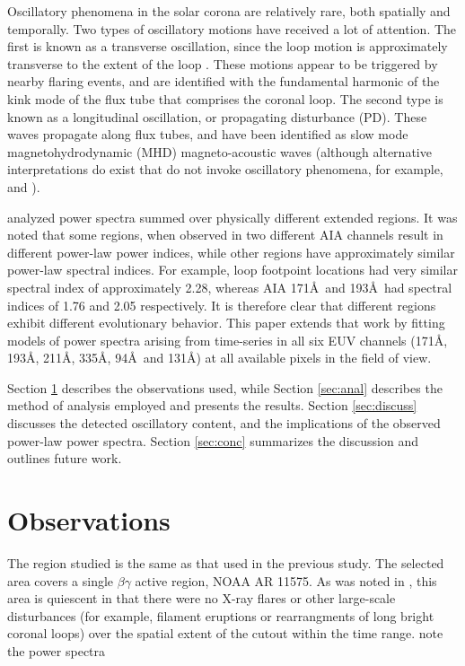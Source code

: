 \documentclass[onecolumn]{emulateapj}
\newcommand{\allaiaeuv}{171\AA, 193\AA, 211\AA, 335\AA, 94\AA\ and 131\AA}
\begin{document}
Oscillatory phenomena in the solar corona are relatively rare, both
spatially and temporally.  Two types of oscillatory motions have
received a lot of attention.  The first is known as a transverse
oscillation, since the loop motion is approximately transverse to the
extent of the loop \citep{1999Sci...285..862N}.  These motions appear
to be triggered by nearby flaring events, and are identified with the
fundamental harmonic of the kink mode of the flux tube that comprises
the coronal loop.  The second type is known as a longitudinal
oscillation, or propagating disturbance (PD).  These waves propagate
along flux tubes, and have been identified as slow mode
magnetohydrodynamic (MHD) magneto-acoustic waves (although alternative
interpretations do exist that do not invoke oscillatory phenomena, for
example, \citealp*{0004-637X-722-2-1013} and
\citealp*{2041-8205-727-2-L37}).  

\cite{ireland2015} analyzed power spectra summed over physically
different extended regions.  It was noted that some regions, when
observed in two different AIA channels result in different power-law
power indices, while other regions have approximately similar
power-law spectral indices.  For example, loop footpoint locations had
very similar spectral index of approximately 2.28, whereas AIA 171\AA\
and 193\AA\ had spectral indices of 1.76 and 2.05 respectively.  It is
therefore clear that different regions exhibit different evolutionary
behavior.  This paper extends that work by fitting models of power
spectra arising from time-series in all six EUV channels (\allaiaeuv)
at all available pixels in the field of view.

Section \ref{sec:obs} describes the observations used, while Section
\ref{sec:anal} describes the method of analysis employed and presents
the results.  Section \ref{sec:discuss} discusses the detected
oscillatory content, and the implications of the observed power-law
power spectra.  Section \ref{sec:conc} summarizes the discussion and
outlines future work.


\section{Observations}\label{sec:obs}
The region studied is the same as that used in the previous
\cite{ireland2015} study.  The selected area covers a single
$\beta\gamma$ active region, NOAA AR 11575.  As was noted in
\cite{ireland2015} , this area is quiescent in that there were no
X-ray flares or other large-scale disturbances (for example, filament
eruptions or rearrangments of long bright coronal loops) over the
spatial extent of the cutout within the time range.
\cite{ireland2015} note the power spectra
\end{document}
